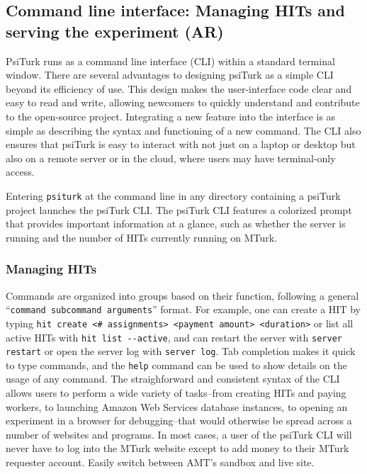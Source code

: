 \documentclass[jou,apacite]{apa6}
\begin{document}
\subsection{Command line interface: Managing HITs and serving the experiment (AR)}

PsiTurk runs as a command line interface (CLI) within a standard terminal window.
There are several advantages to designing psiTurk as a simple CLI beyond its efficiency of use. This
design makes the user-interface code clear and easy to read and write, allowing newcomers to quickly
understand and contribute to the open-source project. Integrating a new feature into the interface
is as simple as describing the syntax and functioning of a new command. The CLI also ensures that
psiTurk is easy to interact with not just on a laptop or desktop but also on a remote server or in
the cloud, where users may have terminal-only access.
 
Entering
\texttt{psiturk} at the command line in any directory containing a psiTurk project launches the
psiTurk CLI.
The psiTurk CLI features a colorized prompt that provides important information at a glance, such as
whether the server is running and the number of HITs currently running on MTurk. 

\subsubsection{Managing HITs}
Commands are
organized into groups based on their function, following a general ``\texttt{command subcommand
arguments}'' format. For example, one can create a HIT by typing \texttt{hit create <\# assignments>
<payment amount> <duration>} or list all active HITs with \texttt{hit list -{}-active}, and can
restart the server with \texttt{server restart} or open the server log with \texttt{server log}. Tab
completion makes it quick to type commands, and the \texttt{help} command can be used to show
details on the usage of any command. The straighforward and consistent syntax of the CLI allows
users to perform a wide variety of tasks--from creating HITs and paying workers, to launching Amazon
Web Services database instances, to opening an experiment in a browser for debugging--that
would otherwise be spread across a number of websites and programs. In most cases, a user of the
psiTurk CLI will never have to log into the MTurk website except to add money to their MTurk
requester account.
Easily switch between AMT's sandbox and live site.
\end{document}
